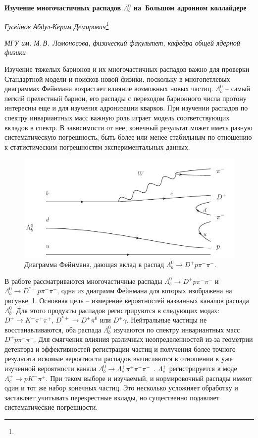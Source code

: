 \documentclass[a4paper, 12pt]{article}
\def\Lb{\varLambda_b^0}
\def\Lc{\varLambda_c^+}
\def\Dp{D^+}
\def\Dsp{D^{*+}}
\def\Km{K^-}
\def\pim{\pi^-}
\def\pip{\pi^+}
\def\piz{\pi^0}
\begin{document}
\begin{center}
{\bf Изучение многочастичных распадов $\Lb$ на~Большом адронном коллайдере }

\textit{Гусейнов Абдул-Керим Демирович}\footnote{}

\textit{МГУ им. М.\,В.~Ломоносова, физический факультет, кафедра общей ядерной физики}
\end{center}

Изучение тяжелых барионов и их многочастичных распадов важно для проверки Стандартной модели и поисков новой физики, поскольку в многопетлевых диаграммах Фейнмана возрастает влияние возможных новых частиц. 
$\Lb$ -- самый легкий прелестный барион, его распады с переходом барионного числа протону интересны еще и для изучения адронизации кварков. 
При изучении распадов по спектру инвариантных масс важную роль играет модель соответствующих вкладов в спектр. В зависимости от нее, конечный результат может иметь разную систематическую погрешность, быть более или менее стабильным по отношению к статистическим погрешностям экспериментальных данных.

\begin{figure}[b]
\includegraphics[width=.6\linewidth]{figures/Feynman}
\caption{Диаграмма Фейнмана, дающая вклад в распад $\Lb\to\Dp p\pim\pim$.}
\label{fig:Feynman}
\end{figure}

В работе рассматриваются многочастичные распады $\Lb\to\Dp p\pim\pim$ и $\Lb\to\Dsp p\pim\pim$, одна из диаграмм Фейнмана для которых изображена на рисунке~\ref{fig:Feynman}. 
Основная цель -- измерение вероятностей названных каналов распада $\Lb$. 
Для этого продукты распадов регистрируются в следующих модах: $\Dp\to\Km\pip\pip$, $\Dsp\to\Dp\piz$ или $\Dp\gamma$. 
Нейтральные частицы не восстанавливаются, оба распада $\Lb$ изучаются по спектру инвариантных масс $\Dp p \pim\pim$. 
Для смягчения влияния различных неопределенностей из-за геометрии детектора и эффективностей регистрации частиц и получения более точного результата искомые вероятности распадов вычисляются в отношении к уже изученной вероятности канала $\Lb\to\Lc\pip\pim\pim$~\cite{LbLc_LHCb, LbLc_CDF}.
$\Lc$ регистрируется в моде $\Lc\to p\Km\pip$. 
При таком выборе и изучаемый, и нормировочный распады имеют один и тот же набор конечных частиц. 
Это несколько усложняет обработку и заставляет учитывать перекрестные вклады, но существенно подавляет систематические погрешности.
\end{document}
